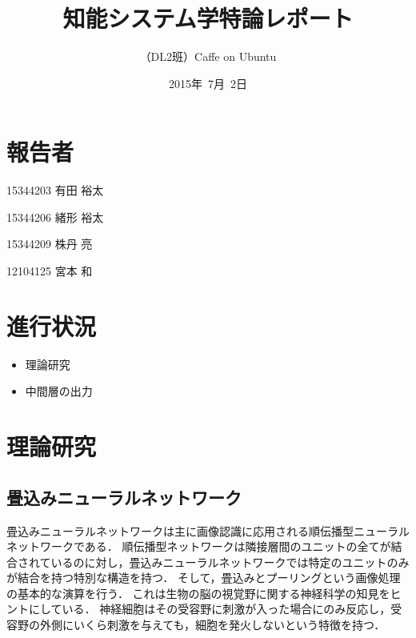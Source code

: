 \documentclass[a4paper,10pt]{jsarticle}
\title{知能システム学特論レポート}
\author{
（DL2班）Caffe on Ubuntu\\
}
\date{2015年\ 7月\ 2日}
\begin{document}
\maketitle
\section{報告者}
\begin{list}{}{}
 \item 15344203\hspace{0.5cm} 有田 裕太
 \item 15344206\hspace{0.5cm} 緒形 裕太
 \item 15344209\hspace{0.5cm} 株丹 亮
 \item 12104125\hspace{0.5cm} 宮本 和
\end{list}

\section{進行状況}

\begin{itemize}
\item 理論研究
\item 中間層の出力
\end{itemize}

\section{理論研究}
\subsection{畳込みニューラルネットワーク}
畳込みニューラルネットワークは主に画像認識に応用される順伝播型ニューラルネットワークである．
順伝播型ネットワークは隣接層間のユニットの全てが結合されているのに対し，畳込みニューラルネットワークでは特定のユニットのみが結合を持つ特別な構造を持つ．
そして，畳込みとプーリングという画像処理の基本的な演算を行う．
これは生物の脳の視覚野に関する神経科学の知見をヒントにしている．
神経細胞はその受容野に刺激が入った場合にのみ反応し，受容野の外側にいくら刺激を与えても，細胞を発火しないという特徴を持つ．
\end{document}
